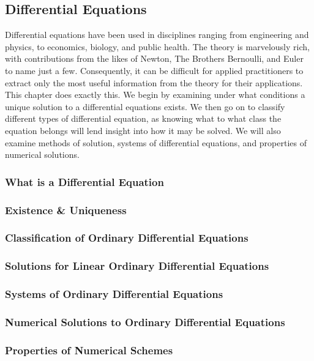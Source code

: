 \subsection{Differential Equations}

Differential equations have been used in disciplines ranging from engineering and physics, to economics, biology, and public health.  The theory is marvelously rich, with contributions from the likes of Newton, The Brothers Bernoulli, and Euler to name just a few.  Consequently, it can be difficult for applied practitioners to extract only the most useful information from the theory for their applications.  This chapter does exactly this.  We begin by examining under what conditions a unique solution to a differential equations exists.  We then go on to classify different types of differential equation, as knowing what to what class the equation belongs will lend insight into how it may be solved.  We will also examine methods of solution, systems of differential equations, and properties of numerical solutions.

\subsubsection{What is a Differential Equation}

\subsubsection{Existence \& Uniqueness}

\subsubsection{Classification of Ordinary Differential Equations}

\subsubsection{Solutions for Linear Ordinary Differential Equations}

\subsubsection{Systems of Ordinary Differential Equations}

\subsubsection{Numerical Solutions to Ordinary Differential Equations}

\subsubsection{Properties of Numerical Schemes}
